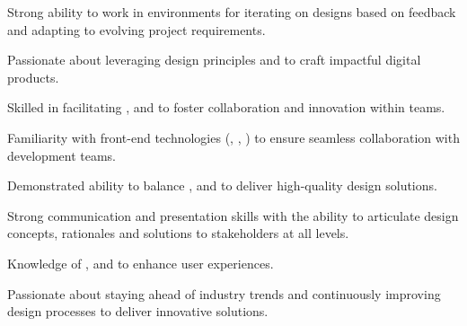\begin{highlightentries}
\begin{highlightitems}
        \item {Strong ability to work in  environments for iterating on designs based on feedback and adapting to evolving project requirements.}
        \item {Passionate about leveraging  design principles and  to craft impactful digital products.}
        \item {Skilled in facilitating ,  and  to foster collaboration and innovation within teams.}
        \item {Familiarity with front-end technologies (, , ) to ensure seamless collaboration with development teams.}
        \item {Demonstrated ability to balance ,  and  to deliver high-quality design solutions.}
        \item {Strong communication and presentation skills with the ability to articulate design concepts, rationales and solutions to stakeholders at all levels.}
        \item {Knowledge of ,  and  to enhance user experiences.}
        \item {Passionate about staying ahead of industry trends and continuously improving design processes to deliver innovative solutions.}
    \end{highlightitems}

\end{highlightentries}
